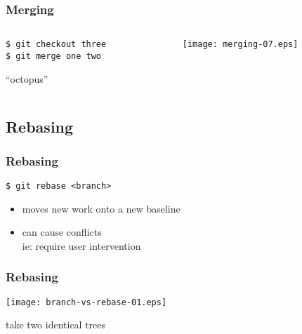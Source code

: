 \documentclass[english]{beamer}
\newcommand{\mysubsection}[2]{%
  \hypertarget{#2}{}%
  \subsection{#1}%
  \label{#2}%
}
\newcommand{\CMD}[1]{%
\texttt{\textcolor{code-green}{#1}}%
}
\newcommand{\cmd}[1]{%
\texttt{\textcolor{code-orange}{#1}}%
}
\newcommand{\faint}[1]{%
\textcolor{code-gray}{#1}%
}
\newcommand{\red}[1]{%
\textcolor{code-red}{#1}%
}
\begin{document}
\begin{frame}
\frametitle{Merging}

\begin{columns}[t]
        \begin{column}[T]{.5\textwidth}
                {\small
                \cmd{\$ git checkout three} \\
                \CMD{\$ git merge one two} \\
                }
                \vspace{.2\textheight}
                \begin{center}
                        ``octopus''
                \end{center}
        \end{column}
        \begin{column}[T]{.5\textwidth}
                \texttt{[image: merging-07.eps]}
        \end{column}
\end{columns}
\end{frame}

\mysubsection{Rebasing}{using:rebasing}
\begin{frame}
\frametitle{Rebasing}

\CMD{\$ git rebase <branch>} \\
\begin{itemize}
        \item moves new work onto a new baseline
        \item can cause \red{conflicts} \\
                \faint{ie: require user intervention}
\end{itemize}
\end{frame}

\begin{frame}
\frametitle{Rebasing}

\texttt{[image: branch-vs-rebase-01.eps]}
\vspace{\baselineskip}
\begin{center}
        take two identical trees
\end{center}
\vspace{\textheight}
\end{frame}
\end{document}
